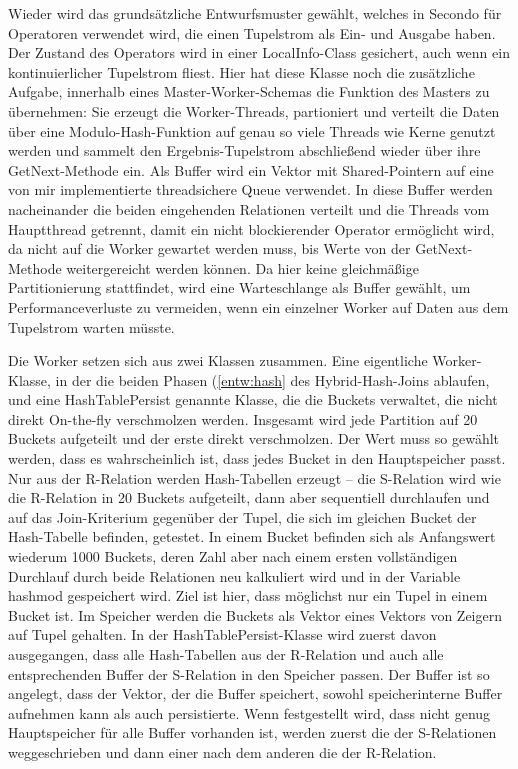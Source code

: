 \documentclass[a4paper,12pt,twoside]{article}
\begin{document}
Wieder wird das grundsätzliche Entwurfsmuster gewählt, welches in Secondo für Operatoren verwendet wird, die einen Tupelstrom als Ein- und Ausgabe haben. Der Zustand des Operators wird in einer LocalInfo-Class gesichert, auch wenn ein kontinuierlicher Tupelstrom fliest. Hier hat diese Klasse noch die zusätzliche Aufgabe, innerhalb eines Master-Worker-Schemas die Funktion des Masters zu übernehmen: Sie erzeugt die Worker-Threads, partioniert und verteilt die Daten über eine Modulo-Hash-Funktion auf genau so viele Threads wie Kerne genutzt werden und sammelt den Ergebnis-Tupelstrom abschließend wieder über ihre GetNext-Methode ein. Als Buffer wird ein Vektor mit Shared-Pointern auf eine von mir implementierte threadsichere Queue verwendet. In diese Buffer werden nacheinander die beiden eingehenden Relationen verteilt und die Threads vom Hauptthread getrennt, damit ein nicht blockierender Operator ermöglicht wird, da nicht auf die Worker gewartet werden muss, bis Werte von der GetNext-Methode weitergereicht werden können. Da hier keine gleichmäßige Partitionierung stattfindet, wird eine Warteschlange als Buffer gewählt, um Performanceverluste zu vermeiden, wenn ein einzelner Worker auf Daten aus dem Tupelstrom warten müsste.

Die Worker setzen sich aus zwei Klassen zusammen. Eine eigentliche Worker-Klasse, in der die beiden Phasen (\autoref{entw:hash} des Hybrid-Hash-Joins ablaufen, und eine HashTablePersist genannte Klasse, die die Buckets verwaltet, die nicht direkt On-the-fly verschmolzen werden. Insgesamt wird jede Partition auf 20 Buckets aufgeteilt und der erste direkt verschmolzen. Der Wert muss so gewählt werden, dass es wahrscheinlich ist, dass jedes Bucket in den Hauptspeicher passt. Nur aus der R-Relation werden Hash-Tabellen erzeugt -- die S-Relation wird wie die R-Relation in 20 Buckets aufgeteilt, dann aber sequentiell durchlaufen und auf das Join-Kriterium gegenüber der Tupel, die sich im gleichen Bucket der Hash-Tabelle befinden, getestet. In einem Bucket befinden sich als Anfangswert wiederum 1000 Buckets, deren Zahl aber nach einem ersten vollständigen Durchlauf durch beide Relationen neu kalkuliert wird und in der Variable hashmod gespeichert wird. Ziel ist hier, dass möglichst nur ein Tupel in einem Bucket ist. Im Speicher werden die Buckets als Vektor eines Vektors von Zeigern auf Tupel gehalten. In der HashTablePersist-Klasse wird zuerst davon ausgegangen, dass alle Hash-Tabellen aus der R-Relation und auch alle entsprechenden Buffer der S-Relation in den Speicher passen. Der Buffer ist so angelegt, dass der Vektor, der die Buffer speichert, sowohl speicherinterne Buffer aufnehmen kann als auch persistierte. Wenn festgestellt wird, dass nicht genug Hauptspeicher für alle Buffer vorhanden ist, werden zuerst die der S-Relationen weggeschrieben und dann einer nach dem anderen die der R-Relation.
\end{document}
